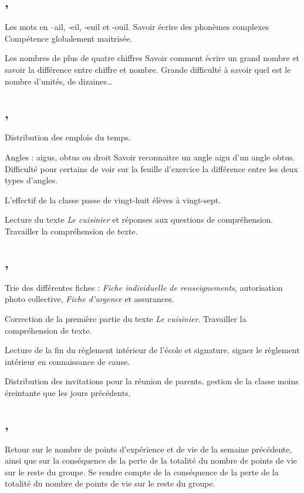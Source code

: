 \documentclass{article}
\begin{document}
	
	\subsection{ \sep}
	\dIs\cfr{} Les mots en –ail, -eil, -euil et -ouil.
	\obj Savoir écrire des phonèmes complexes
	\bil Compétence globalement maitrisée.
	
	\dIs\cma{} Les nombres de plus de quatre chiffres
	\obj Savoir comment écrire un grand nombre et savoir la différence entre chiffre et nombre.
	\bil Grande difficulté à savoir quel est le nombre d’unités, de dizaines\dots
	
	
	\subsection{ \sep}
	\dIs\cge{} Distribution des emplois du temps.
	
	\dIs\cma{} Angles : aigus, obtus ou droit
	\obj Savoir reconnaitre un angle aigu d’un angle obtus.
	\bil Difficulté pour certains de voir sur la feuille d’exercice la différence entre les deux types d’angles.
	
	\dIs\cge{} L’effectif de la classe passe de vingt-huit élèves à vingt-sept.
	
	\dIs\cfr{} Lecture du texte \emph{Le cuisinier} et réponses aux questions de compréhension.
	\obj Travailler la compréhension de texte.
	
	
	\subsection{ \sep}
	\dIs\cge{} Trie  des différentes fiches : \textit{Fiche individuelle de renseignements}, autorisation photo collective, \textit{Fiche d’urgence} et assurances.
	
	\dIs\cfr{} Correction de la première partie du texte \emph{Le cuisinier}.
	\obj Travailler la compréhension de texte.
	
	\dIs\chg{} Lecture de la fin du règlement intérieur de l’école et signature.
	\obj signer le règlement intérieur en connaissance de cause.
	
	\dIs\cge{} Distribution des invitations pour la réunion de parents.
	\bil gestion de la classe moins éreintante que les jours précédents. 
	
	
	\subsection{ \sep}
	\dIs\cge{} Retour sur le nombre de points d’expérience et de vie de la semaine précédente, ainsi que sur la conséquence de la perte de la totalité du nombre de points de vie sur le reste du groupe.
	\obj Se rendre compte de la conséquence de la perte de la totalité du nombre de points de vie sur le reste du groupe.
	
\end{document}
